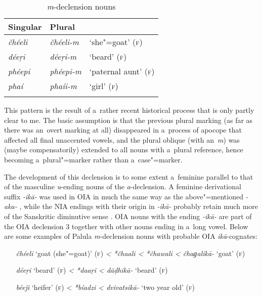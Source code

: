 \begin{table}[ht]
\caption{\textit{m}-declension nouns}
\begin{tabularx}{.75\textwidth}{ Q Q l }
\lsptoprule
Singular &
Plural &
\\\hline
\textit{čhéeli } &
\textit{čhéeli-m} &
`she"=goat' (\textsc{f})\\
\textit{déeṛi} &
\textit{déeṛi-m} &
`beard' (\textsc{f})\\
\textit{phéepi} &
\textit{phéepi-m} &
`paternal aunt' (\textsc{f})\\
\textit{phaí} &
\textit{phaíi-m} &
`girl' (\textsc{f})\\\lspbottomrule
\end{tabularx}
\label{tab:4-16}
\end{table}


This pattern is the result of a~rather recent historical process that is only partly clear to me. The basic assumption is that the previous plural marking (as far as there was an~overt marking at all) disappeared in a~process of apocope that affected all final unaccented vowels, and the plural oblique (with an~\textit{m}) was (maybe compensatorily) extended to all nouns with a~plural reference, hence becoming a~plural"=marker rather than a~case"=marker.


The development of this declension is to some extent a~feminine parallel to that of the masculine \textit{u}-ending nouns of the \textit{a}-declension. A feminine derivational suffix \textit{-ikā-} was used in OIA in much the same way as the above"=mentioned \textit{-aka-} \citep[1222]{whitney1960}, while the NIA endings with their origin in \textit{-ikā-} probably retain much more of the Sanskritic diminutive sense \citep[222]{masica1991}. OIA nouns with the ending \textit{-ikā-} are part of the OIA declension 3 together with other nouns ending in a~long vowel. Below are some examples of Palula \textit{m}-declension nouns with probable OIA \textit{ikā}-cognates: 


\begin{itemize}[leftmargin=]
\item[\textit{čhéeli} `goat (she"=goat)' (\textsc{f})] \textit{{\textless} *čhaali {\textless} *čhawali {\textless} čhaɡalikā-} `goat' (\textsc{f})
\item[\textit{déeṛi} `beard' (\textsc{f})] \textit{{\textless} *daaṛi {\textless} dāḍhikā-} `beard' (\textsc{f})
\item[\textit{béeǰi} `heifer' (\textsc{f})] {\textless} \textit{*bíadzi {\textless} dvivatsikā-} `two year old' (\textsc{f})
\end{itemize}

